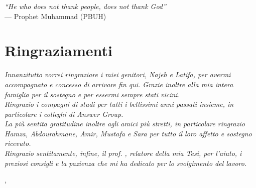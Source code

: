 
\cleardoublepage
{}
{}

\leavevmode	\newline

\begin{flushright}{
	\slshape    
	``He who does not thank people, does not thank God''} \\ 
	\medskip
    --- Prophet Muhammad (PBUH)
\end{flushright}


\bigskip

\begingroup
\let\clearpage\relax
\let\cleardoublepage\relax
\let\cleardoublepage\relax

\chapter*{Ringraziamenti}

 \noindent \textit{Innanzitutto vorrei ringraziare i miei genitori, Najeh e Latifa, per avermi accompagnato e concesso di arrivare fin qui. Grazie inoltre alla mia intera famiglia per il sostegno e per essermi sempre stati vicini.}\\

\noindent \textit{Ringrazio i compagni di studi per tutti i bellissimi anni passati insieme, in particolare i colleghi di Answer Group.}\\

\noindent \textit{La più sentita gratitudine inoltre agli amici più stretti, in particolare ringrazio Hamza, Abdourahmane, Amir, Mustafa e Sara per tutto il loro affetto e sostegno ricevuto.}\\


\noindent \textit{Ringrazio sentitamente, infine, il prof. \myProf, relatore della mia Tesi, per l'aiuto, i preziosi consigli e la pazienza che mi ha dedicato per lo svolgimento del lavoro.}\\

\bigskip

\noindent\textit{\myLocation, \myTime}
\hfill \myName

\endgroup


